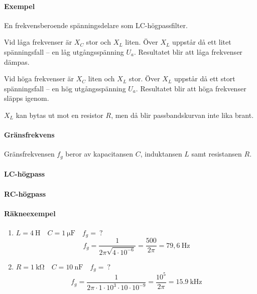 \paragraph{Exempel} En frekvensberoende spänningsdelare som LC-högpassfilter.

Vid låga frekvenser är \(X_C\) stor och \(X_L\) liten.
Över \(X_L\) uppstår då ett litet spänningsfall -- en låg utgångsspänning \(U_a\).
Resultatet blir att låga frekvenser dämpas.

Vid höga frekvenser är \(X_C\) liten och \(X_L\) stor.
Över \(X_L\) uppstår då ett stort spänningsfall -- en hög utgångsspänning
\(U_a\).
Resultatet blir att höga frekvenser släpps igenom.

\(X_L\) kan bytas ut mot en resistor \(R\), men då blir passbandskurvan inte lika brant.

\paragraph{Gränsfrekvens}

Gränsfrekvensen \(f_g\) beror av kapacitansen \(C\), induktansen \(L\) samt
resistansen \(R\).

\paragraph{LC-högpass}

\paragraph{RC-högpass}

\paragraph{Räkneexempel}
\begin{enumerate}
\item \(L = 4\ \text{H} \quad C = 1\ \unit{\micro\farad} \quad f_g =\ ?\)
  \[
  f_g = \frac{1}{2\pi \sqrt{4 \cdot 10^{-6}}} = \frac{500}{2\pi }
  = 79,6\ \text{Hz}
  \]
\item \(R = \qty{1}{\kilo\ohm} \quad C = 10\ \text{nF} \quad f_g =\ ?\)
  \[
    f_g = \frac{1}{2\pi  \cdot 1 \cdot 10^3 \cdot 10 \cdot 10^{-9}}
    = \frac{10^5}{2\pi } = \qty{15,9}{\kilo\hertz}
  \]
\end{enumerate}


